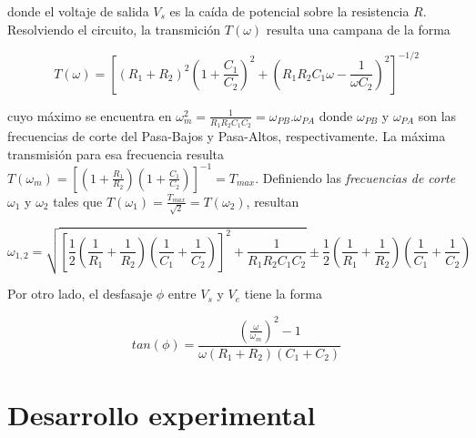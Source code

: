 \documentclass[11pt,a4paper]{article}
\begin{document}
donde el voltaje de salida $V_s$ es la caída de potencial sobre la resistencia $R$. Resolviendo el circuito, la transmición $T(\omega)$ resulta una campana de la forma

\begin{equation}
T(\omega) = [(R_1+R_2)^2(1+\frac{C_1}{C_2})^2+(R_1R_2C_1\omega-\frac{1}{\omega C_2})^2]^{-1/2}
\label{trans_PBanda}
\end{equation}

cuyo máximo se encuentra en $\omega_m^2 = \frac{1}{R_1R_2C_1C_2} = \omega_{PB}.\omega_{PA}$ donde $\omega_{PB}$ y $\omega_{PA}$ son las frecuencias de corte del Pasa-Bajos y Pasa-Altos, respectivamente. La máxima transmisión para esa frecuencia resulta $T(\omega_m) = [(1+\frac{R_1}{R_2})(1+\frac{C_1}{C_2})]^{-1} = T_{max}$. Definiendo las \textit{frecuencias de corte} $\omega_1$ y $\omega_2$ tales que $T(\omega_1) = \frac{T_{max}}{\sqrt{2}} = T(\omega_2)$, resultan

\begin{equation}
\omega_{1,2} = \sqrt{[\frac{1}{2}(\frac{1}{R_1}+\frac{1}{R_2})(\frac{1}{C_1}+\frac{1}{C_2})]^2+\frac{1}{R_1R_2C_1C_2}} \pm \frac{1}{2}(\frac{1}{R_1}+\frac{1}{R_2})(\frac{1}{C_1}+\frac{1}{C_2})
\label{corte_PBanda}
\end{equation}

Por otro lado, el desfasaje $\phi$ entre $V_s$ y $V_e$ tiene la forma

\begin{equation}
tan(\phi) = \frac{(\frac{\omega}{\omega_m})^2-1}{\omega (R_1+R_2)(C_1+C_2)}
\label{des_PBanda}
\end{equation}


\section{Desarrollo experimental}
\end{document}
